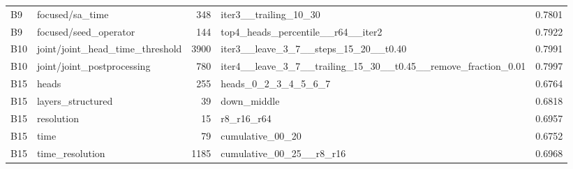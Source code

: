 {\begin{longtable}{>{\raggedright\arraybackslash}p{1.40cm}>{\raggedright\arraybackslash}p{3.67cm}r>{\raggedright\arraybackslash}p{5.74cm}r}
B9 & focused/\allowbreak{}sa\_\allowbreak{}time & 348 & iter3\_\allowbreak{}\_\allowbreak{}trailing\_\allowbreak{}10\_\allowbreak{}30 & 0.7801 \\
B9 & focused/\allowbreak{}seed\_\allowbreak{}operator & 144 & top4\_\allowbreak{}heads\_\allowbreak{}percentile\_\allowbreak{}\_\allowbreak{}r64\_\allowbreak{}\_\allowbreak{}iter2 & 0.7922 \\
B10 & joint/\allowbreak{}joint\_\allowbreak{}head\_\allowbreak{}time\_\allowbreak{}threshold & 3900 & iter3\_\allowbreak{}\_\allowbreak{}leave\_\allowbreak{}3\_\allowbreak{}7\_\allowbreak{}\_\allowbreak{}steps\_\allowbreak{}15\_\allowbreak{}20\_\allowbreak{}\_\allowbreak{}t0.40 & 0.7991 \\
B10 & joint/\allowbreak{}joint\_\allowbreak{}postprocessing & 780 & iter4\_\allowbreak{}\_\allowbreak{}leave\_\allowbreak{}3\_\allowbreak{}7\_\allowbreak{}\_\allowbreak{}trailing\_\allowbreak{}15\_\allowbreak{}30\_\allowbreak{}\_\allowbreak{}t0.45\_\allowbreak{}\_\allowbreak{}remove\_\allowbreak{}fraction\_\allowbreak{}0.01 & 0.7997 \\
B15 & heads & 255 & heads\_\allowbreak{}0\_\allowbreak{}2\_\allowbreak{}3\_\allowbreak{}4\_\allowbreak{}5\_\allowbreak{}6\_\allowbreak{}7 & 0.6764 \\
B15 & layers\_\allowbreak{}structured & 39 & down\_\allowbreak{}middle & 0.6818 \\
B15 & resolution & 15 & r8\_\allowbreak{}r16\_\allowbreak{}r64 & 0.6957 \\
B15 & time & 79 & cumulative\_\allowbreak{}00\_\allowbreak{}20 & 0.6752 \\
B15 & time\_\allowbreak{}resolution & 1185 & cumulative\_\allowbreak{}00\_\allowbreak{}25\_\allowbreak{}\_\allowbreak{}r8\_\allowbreak{}r16 & 0.6968 \\
\bottomrule
\end{longtable}}
